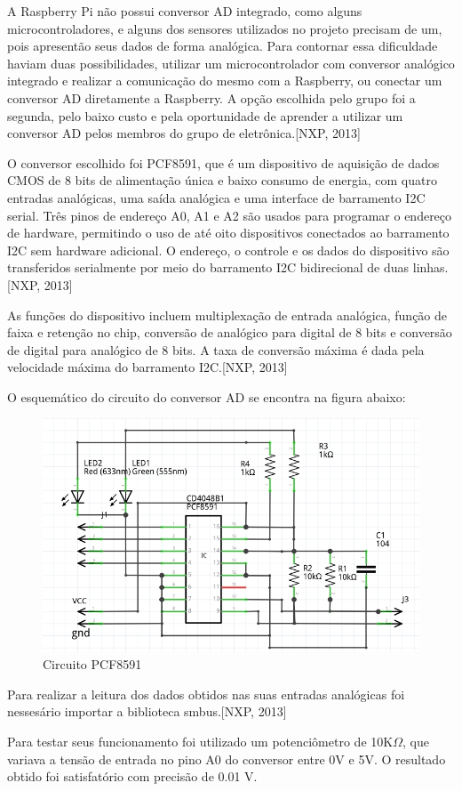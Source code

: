 A Raspberry Pi não possui conversor AD integrado, como alguns microcontroladores, e alguns dos sensores utilizados no projeto precisam de um, pois apresentão seus dados de forma analógica. Para contornar essa dificuldade haviam duas possibilidades, utilizar um microcontrolador com conversor analógico integrado e realizar a comunicação do mesmo com a Raspberry, ou conectar um conversor AD diretamente a Raspberry. A opção escolhida pelo grupo foi a segunda, pelo baixo custo e pela oportunidade de aprender a utilizar um conversor AD pelos membros do grupo de eletrônica.[NXP, 2013]

O conversor escolhido foi PCF8591, que é um dispositivo de aquisição de dados CMOS de 8 bits de alimentação única e baixo consumo de energia, com quatro entradas analógicas, uma saída analógica e uma interface de barramento I2C serial. Três pinos de endereço A0, A1 e A2 são usados para programar o endereço de hardware, permitindo o uso de até oito dispositivos conectados ao barramento I2C sem hardware adicional. O endereço, o controle e os dados do dispositivo são transferidos serialmente por meio do barramento I2C bidirecional de duas linhas.[NXP, 2013]

As funções do dispositivo incluem multiplexação de entrada analógica, função de faixa e retenção no chip, conversão de analógico para digital de 8 bits e conversão de digital para analógico de 8 bits. A taxa de conversão máxima é dada pela velocidade máxima do barramento I2C.[NXP, 2013]

O esquemático do circuito do conversor AD se encontra na figura abaixo:

\begin{figure}[H]
	\centering
	\includegraphics[width=12cm]{figuras/circuito_1.png}
	\caption{Circuito PCF8591} \label{circuito_1}
\end{figure}

Para realizar a leitura dos dados obtidos nas suas entradas analógicas foi nessesário importar a biblioteca smbus.[NXP, 2013]

Para testar seus funcionamento foi utilizado um potenciômetro de 10K$\Omega$, que variava a tensão de entrada no pino A0 do conversor entre 0V e 5V. O resultado obtido foi satisfatório com precisão de 0.01 V.
